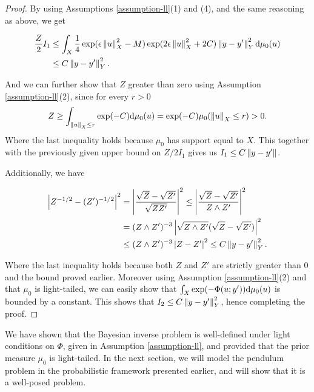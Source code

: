 \begin{proof}
  By using Assumptions \ref{assumption-ll}(1) and (4), and the same reasoning as above, we get

  \begin{equation*}
    \begin{aligned}
      \frac{Z}2I_1 &\le \int_X\frac14\exp(\epsilon\left\lVert u\right\rVert_X^2 - M)\exp(2\epsilon\left\lVert u\right\rVert_X^2 + 2C)\left\lVert y - y'\right\rVert_Y^2 \text{d}\mu_0(u)\\
        & \le C\left\lVert y - y'\right\rVert_Y^2.
    \end{aligned}
  \end{equation*}

  And we can further show that $Z$ greater than zero using Assumption \ref{assumption-ll}(2), since for every $r > 0$
  \begin{equation*}
    Z \ge \int_{\left\lVert u\right\rVert_X \le r}\exp(-C)\text{d}\mu_0(u) = \exp(-C)\mu_0(\left\lVert u\right\rVert_X \le r) > 0.
  \end{equation*}
  Where the last inequality holds because $\mu_0$ has support equal to $X$. This together with the previously given upper bound on $Z / 2 I_1$ gives us $I_1 \le C\left\lVert y - y'\right\rVert$.

  Additionally, we have

  \begin{align*}
    \left|Z^{-1/2} - (Z')^{-1/2}\right|^2
    &= \left|\frac{\sqrt{Z} - \sqrt{Z'}}{\sqrt{ZZ'}}\right|^2 \leq \left|\frac{\sqrt{Z} - \sqrt{Z'}}{Z \land Z'}\right|^2 \\
    &= (Z \land Z')^{-3}\left|\sqrt{Z \land Z'}(\sqrt{Z} - \sqrt{Z'})\right|^2\\
    &\le (Z \land Z')^{-3}\left|Z - Z'\right|^2 \le C\left\lVert y - y'\right\rVert_Y^2.
  \end{align*}

  Where the last inequality holds because both $Z$ and $Z'$ are strictly greater than $0$ and the bound proved earlier. Moreover using Assumption \ref{assumption-ll}(2) and that $\mu_0$ is light-tailed, we can easily show that $\int_X\exp(-\Phi(u; y'))\text{d}\mu_0(u)$ is bounded by a constant. This shows that $I_2 \le C\left\lVert y - y'\right\rVert_Y^2$, hence completing the proof.
\end{proof}

We have shown that the Bayesian inverse problem is well-defined under light conditions on $\Phi$, given in Assumption \ref{assumption-ll}, and provided that the prior measure $\mu_0$ is light-tailed. In the next section, we will model the pendulum problem in the probabilistic framework presented earlier, and will show that it is a well-posed problem.

